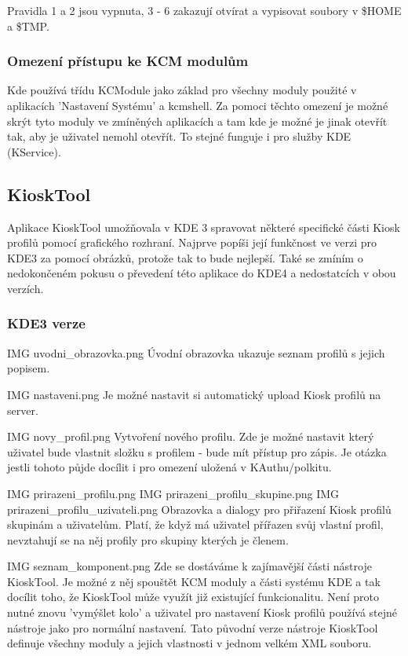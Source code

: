 Pravidla 1 a 2 jsou vypnuta, 3 - 6 zakazují otvírat a vypisovat soubory
v \$HOME a \$TMP.

\subsubsection{Omezení přístupu ke KCM modulům}
Kde používá třídu KCModule jako základ pro všechny moduly použité v aplikacích
'Nastavení Systému' a kcmshell. Za pomoci těchto omezení je možné skrýt
tyto moduly ve zmíněných aplikacích a tam kde je možné je jinak otevřít tak,
aby je uživatel nemohl otevřít. To stejné funguje i pro služby KDE (KService).
\subsection{KioskTool}
Aplikace KioskTool umožňovala v KDE 3 spravovat některé specifické části Kiosk
profilů pomocí grafického rozhraní. Najprve popíši její funkčnost ve verzi pro
KDE3 za pomocí obrázků, protože tak to bude nejlepší. Také se zmíním
o nedokončeném pokusu o převedení této aplikace do KDE4 a nedostatcích v obou
verzích.
\subsubsection{KDE3 verze}
IMG uvodni_obrazovka.png
Úvodní obrazovka ukazuje seznam profilů s jejich popisem.

IMG nastaveni.png
Je možné nastavit si automatický upload Kiosk profilů na server.

IMG novy_profil.png
Vytvoření nového profilu. Zde je možné nastavit který uživatel bude vlastnit
složku s profilem - bude mít přístup pro zápis. Je otázka jestli tohoto půjde
docílit i pro omezení uložená v KAuthu/polkitu.

IMG prirazeni_profilu.png
IMG prirazeni_profilu_skupine.png
IMG prirazeni_profilu_uzivateli.png
Obrazovka a dialogy pro přiřazení Kiosk profilů skupinám a uživatelům. Platí,
že když má uživatel přířazen svůj vlastní profil, nevztahují se na něj profily
pro skupiny kterých je členem.

IMG seznam_komponent.png
Zde se dostáváme k zajímavější části nástroje KioskTool. Je možné z něj spouštět
KCM moduly a části systému KDE a tak docílit toho, že KioskTool může využít již
existující funkcionalitu. Není proto nutné znovu 'vymýšlet kolo' a uživatel
pro nastavení Kiosk profilů používá stejné nástroje jako pro normální nastavení.
Tato původní verze nástroje KioskTool definuje všechny moduly a jejich
vlastnosti v jednom velkém XML souboru.

